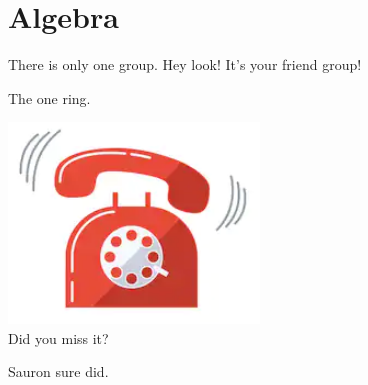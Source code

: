 \setcounter{section}{0}

\section{Algebra}
There is only one group. Hey look! It's your friend group!
\begin{center}
\end{center}

The one ring.
\begin{center}
  \includegraphics[width=0.5\textwidth]{ring.png}\\
  Did you miss it?
\end{center}
Sauron sure did.

